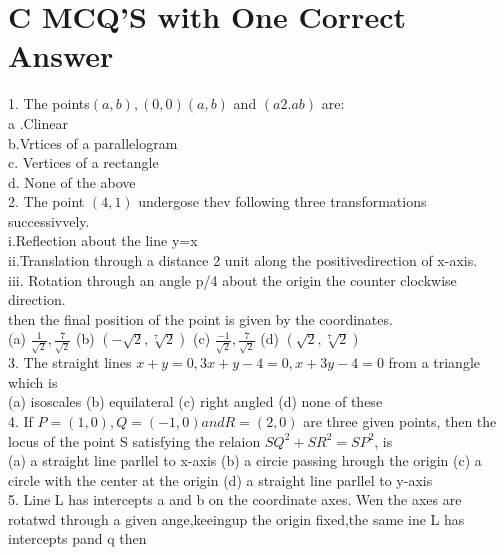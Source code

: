 \documentclass[12pt]{article}
\begin{document}
\section*{C   MCQ'S with One Correct Answer}

1. 	The points$(a,b),(0,0)(a,b)$ and $(a2.ab)$ are:\\
a .Clinear\\
b.Vrtices of a parallelogram\\
c. Vertices of a rectangle\\
d. None of the above\\
2. The point $(4,1)$ undergose thev  following three transformations successivvely.\\
i.Reflection about the line y=x\\
 ii.Translation through a distance 2 unit along the positivedirection of x-axis.\\
iii. Rotation through an angle p/4 about the origin the counter clockwise direction.\\
then the final position of the point is given by the coordinates.\\
(a)     $\frac{1}{\sqrt{2}},\frac{7}{\sqrt{2}}$   \hspace{1cm}  (b)     $(-\sqrt{2}, \sqrt[7]{2})$  \hspace{1cm} (c)    $\frac{-1}{\sqrt{2}},\frac{7}{\sqrt{2}}$ \hspace{1cm}(d)     $(\sqrt{2}, \sqrt[7]{2})$\\
3. The straight lines $x+y=0, 3x+y-4=0,x+3y-4=0$ from a triangle which is \\
(a) isoscales \hspace{1cm}   (b) equilateral  \hspace{1cm}  (c)  right angled  \hspace{1cm}  (d)  none of these \\
4. If $P=(1,0), Q=(-1,0) and R=(2,0)$ are three given
points, then  the locus  of the point S satisfying the relaion $SQ^2+SR^2=SP^2$, is\\
(a)  a straight line parllel to x-axis  \hspace{1cm}   (b) a circie passing hrough the origin \hspace{1cm}(c)  a circle with the center at the origin  \hspace{1cm}  (d)  a straight line parllel to y-axis\\
5. Line L has intercepts a and b on the coordinate axes. Wen the axes are rotatwd through a given ange,keeingup the origin fixed,the same ine L has intercepts  pand q then\\
\end{document}
